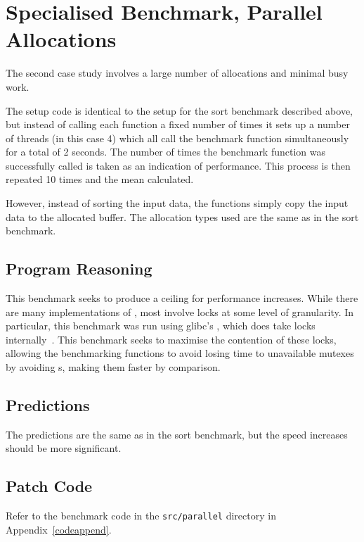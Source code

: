 \pagebreak

\section{Specialised Benchmark, Parallel Allocations}

The second case study involves a large number of allocations and minimal busy work.

The setup code is identical to the setup for the sort benchmark described above, but instead of calling each function a fixed number of times it sets up a number of threads (in this case 4) which all call the benchmark function simultaneously for a total of 2 seconds. The number of times the benchmark function was successfully called is taken as an indication of performance. This process is then repeated 10 times and the mean calculated.

However, instead of sorting the input data, the functions simply copy the input data to the allocated buffer. The allocation types used are the same as in the sort benchmark.

\subsection{Program Reasoning}

This benchmark seeks to produce a ceiling for performance increases. While there are many implementations of \malloc{}, most involve locks at some level of granularity. In particular, this benchmark was run using glibc's \malloc{}, which does take locks internally~\cite{glibcmalloc}. This benchmark seeks to maximise the contention of these locks, allowing the benchmarking functions to avoid losing time to unavailable mutexes by avoiding \malloc{}s, making them faster by comparison.

\subsection{Predictions}

The predictions are the same as in the sort benchmark, but the speed increases should be more significant.

\subsection{Patch Code}

Refer to the benchmark code in the \texttt{src/parallel} directory in Appendix~\ref{codeappend}.


